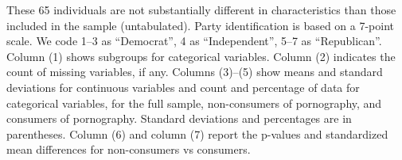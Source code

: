 \documentclass[12pt,twoside]{article}
\begin{document}
\begin{table}[ht]
{		These 65 individuals are not substantially different in characteristics than those included in the sample (untabulated).
		Party identification is based on a 7-point scale. We code 1--3 as ``Democrat'', 4 as ``Independent'', 5--7 as ``Republican''.
		Column (1) shows subgroups for categorical variables.
		Column (2) indicates the count of missing variables, if any.
		Columns (3)--(5) show means and standard deviations for continuous variables and count and percentage of data for categorical variables, for the full sample, non-consumers of pornography, and consumers of pornography.
		Standard deviations and percentages are in parentheses.
		Column (6) and column (7) report the p-values and standardized mean differences for non-consumers vs consumers.
	}
\end{table}
\fi



\clearpage
\end{document}
